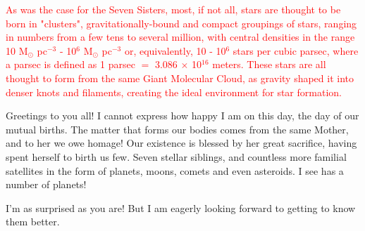 \documentclass[main.tex]{subfiles}
\begin{document}
\begin{tcolorbox}[sharp corners, colback=red!30, colframe=red!80!blue, title=Star Clusters]
\par \textcolor{red} {As was the case for the Seven Sisters, most, if not all, stars are thought to be born in "clusters", gravitationally-bound and compact groupings of stars, ranging in numbers from a few tens to several million, with central densities in the range 10 M$_{\odot}$ pc$^{-3}$ - 10$^6$ M$_{\odot}$ pc$^{-3}$ or, equivalently, 10 - 10$^6$ stars per cubic parsec, where a parsec is defined as 1 parsec $=$ 3.086 $\times$ 10$^{16}$ meters.  These stars are all thought to form from the same Giant Molecular Cloud, as gravity shaped it into denser knots and filaments, creating the ideal environment for star formation.}  
\end{tcolorbox} 

\par \Maia Greetings to you all!  I cannot express how happy I am on this day, the day of our mutual births.  The matter that forms our bodies comes from the same Mother, and to her we owe homage!  Our existence is blessed by her great sacrifice, having spent herself to birth us few.  Seven stellar siblings, and countless more familial satellites in the form of planets, moons, comets and even asteroids.  I see \rmelectra has a number of planets!

\par \Electra I'm as surprised as you are!  But I am eagerly looking forward to getting to know them better.
\end{document}

